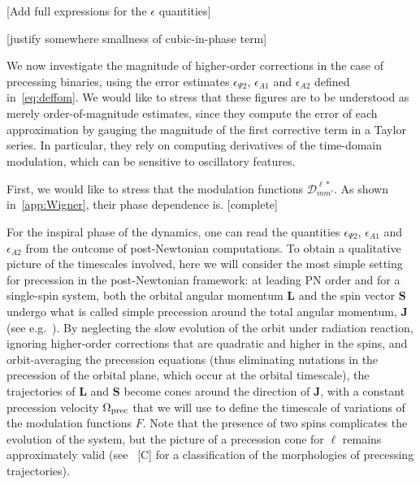 \documentclass[aps,showpacs,twocolumn,
prd,superscriptaddress,nofootinbib]{revtex4-1}
\newcommand\calD{{\mathcal{D}}}
\newcommand{\SM}[1]{{\color{Red} #1}}
\begin{document}
\SM{[Add full expressions for the $\epsilon$ quantities]}

\SM{[justify somewhere smallness of cubic-in-phase term]}

We now investigate the magnitude of higher-order corrections in the case of precessing binaries, using the error estimates $\epsilon_{\Psi 2}$, $\epsilon_{A1}$ and $\epsilon_{A 2}$ defined in~\eqref{eq:deffom}. We would like to stress that these figures are to be understood as merely order-of-magnitude estimates, since they compute the error of each approximation by gauging the magnitude of the first corrective term in a Taylor series. In particular, they rely on computing derivatives of the time-domain modulation, which can be sensitive to oscillatory features.

First, we would like to stress that the modulation functions $\calD^{\ell *}_{mm'}$. As shown in~\ref{app:Wigner}, their phase dependence is. \SM{[complete]}

For the inspiral phase of the dynamics, one can read the quantities $\epsilon_{\Psi 2}$, $\epsilon_{A1}$ and $\epsilon_{A 2}$ from the outcome of post-Newtonian computations. To obtain a qualitative picture of the timescales involved, here we will consider the most simple setting for precession in the post-Newtonian framework: at leading PN order and for a single-spin system, both the orbital angular momentum $\bm{L}$ and the spin vector $\bm{S}$ undergo what is called simple precession around the total angular momentum, $\bm{J}$ (see e.g.~\cite{Apostolatos+94, Kidder95}). By neglecting the slow evolution of the orbit under radiation reaction, ignoring higher-order corrections that are quadratic and higher in the spins, and orbit-averaging the precession equations (thus eliminating nutations in the precession of the orbital plane, which occur at the orbital timescale), the trajectories of $\bm{L}$ and $\bm{S}$ become cones around the direction of $\bm{J}$, with a constant precession velocity $\Omega_{\rm prec}$ that we will use to define the timescale of variations of the modulation functions $F$. Note that the presence of two spins complicates the evolution of the system, but the picture of a precession cone for $\bm{\ell}$ remains approximately valid (see~\cite{} \SM{[C]} for a classification of the morphologies of precessing trajectories).
\end{document}
